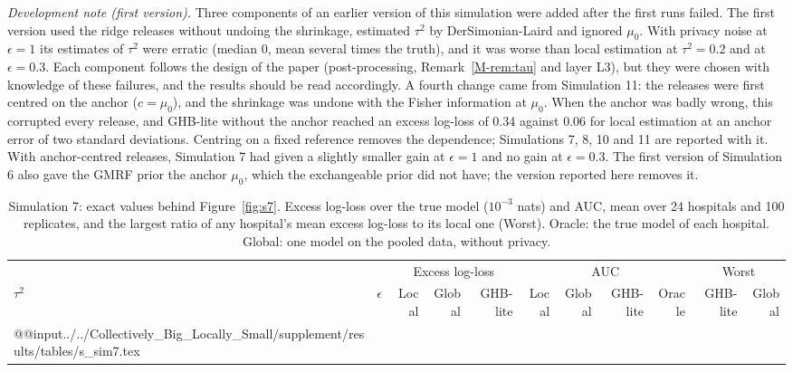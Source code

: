 \documentclass[acmsmall,screen,nonacm]{acmart}
\theoremstyle{acmdefinition}
\begin{document}
\emph{Development note (first version).} Three components of an earlier version of this simulation were added after the first runs failed. The first version used the ridge releases without undoing the shrinkage, estimated $\tau^2$ by DerSimonian-Laird \cite{dersimonian1986meta} and ignored $\mu_0$. With privacy noise at $\epsilon=1$ its estimates of $\tau^2$ were erratic (median 0, mean several times the truth), and it was worse than local estimation at $\tau^2=0.2$ and at $\epsilon=0.3$. Each component follows the design of the paper (post-processing, Remark~\ref{M-rem:tau} and layer L3), but they were chosen with knowledge of these failures, and the results should be read accordingly. A fourth change came from Simulation 11: the releases were first centred on the anchor ($c=\mu_0$), and the shrinkage was undone with the Fisher information at $\mu_0$. When the anchor was badly wrong, this corrupted every release, and GHB-lite without the anchor reached an excess log-loss of 0.34 against 0.06 for local estimation at an anchor error of two standard deviations. Centring on a fixed reference removes the dependence; Simulations 7, 8, 10 and 11 are reported with it. With anchor-centred releases, Simulation 7 had given a slightly smaller gain at $\epsilon=1$ and no gain at $\epsilon=0.3$. The first version of Simulation 6 also gave the GMRF prior the anchor $\mu_0$, which the exchangeable prior did not have; the version reported here removes it.

\begin{table}[t]
\caption{Simulation 7: exact values behind Figure~\ref{fig:s7}. Excess log-loss over the true model ($10^{-3}$ nats) and AUC, mean over 24 hospitals and 100 replicates, and the largest ratio of any hospital's mean excess log-loss to its local one (Worst). Oracle: the true model of each hospital. Global: one model on the pooled data, without privacy.}
\label{tab:s7}
\scriptsize
\setlength{\tabcolsep}{4pt}
\begin{tabular}{@{}llrrrrrrrrr@{}}
\toprule
 & & \multicolumn{3}{c}{Excess log-loss} & \multicolumn{4}{c}{AUC} & \multicolumn{2}{c}{Worst}\\
\cmidrule(lr){3-5}\cmidrule(lr){6-9}\cmidrule(l){10-11}
$\tau^2$ & $\epsilon$ & Local & Global & GHB-lite & Local & Global & GHB-lite & Oracle & GHB-lite & Global\\
\midrule
\csname @@input\endcsname../../Collectively_Big_Locally_Small/supplement/results/tables/s_sim7.tex 
\bottomrule
\end{tabular}
\end{table}
\end{document}
